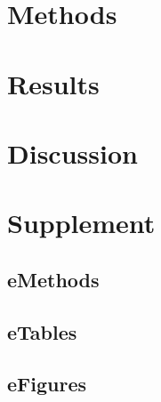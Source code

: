 \documentclass[12pt,a4paper]{article}
\begin{document}
\section{Methods}

\section{Results}

\section{Discussion}




\newpage
\appendix
\section*{Supplement}

\subsection*{eMethods}

\subsection*{eTables}

\subsection*{eFigures}
\end{document}
